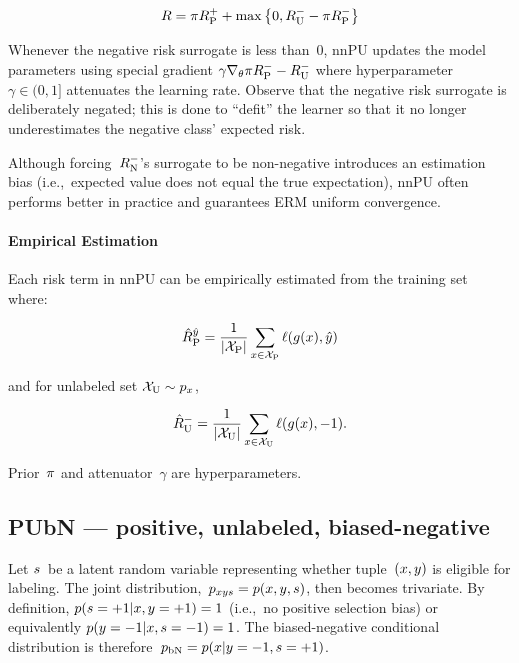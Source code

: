 \begin{equation}\label{eq:Risk:nnPU}
  R = \pi R_{\textnormal{P}}^{{+}} + \max\left\{0, R_{\textnormal{U}}^{{-}} - \pi R_{\textnormal{P}}^{{-}} \right\}
\end{equation}

Whenever the negative risk surrogate is less than~0, nnPU updates the model parameters using special gradient ${\gamma \nabla_{\theta} \pi R_{\textnormal{P}}^{{-}} - R_{\textnormal{U}}^{{-}}}$ where hyperparameter~${\gamma \in (0,1]}$ attenuates the learning rate.  Observe that the negative risk surrogate is deliberately negated; this is done to ``defit'' the learner so that it no longer underestimates the negative class' expected risk.

Although forcing~$R_{\textnormal{N}}^{{-}}$'s surrogate to be non-negative introduces an estimation bias (i.e.,~expected value does not equal the true expectation), nnPU often performs better in practice and guarantees ERM uniform convergence.

\paragraph{Empirical Estimation} Each risk term in nnPU can be empirically estimated from the training set where:

\begin{equation}\label{eq:EmpRisk:Pos}
  \hat{R}_{\textnormal{P}}^{\hat{y}} = \frac{1}{\lvert\mathcal{X}_{\textnormal{P}}\rvert} \sum_{x \in \mathcal{X}_{\textnormal{P}}} \ell\mathopen{}\left(g\mathopen{}\left(x\right)\mathclose{},\hat{y}\right)\mathclose{}
\end{equation}

\noindent
and for unlabeled set ${\mathcal{X}_{\textnormal{U}} \sim p_{x}}$,

\begin{equation}
  \hat{R}_{\textnormal{U}}^{-} = \frac{1}{\lvert\mathcal{X}_{\textnormal{U}}\rvert} \sum_{x \in \mathcal{X}_{\textnormal{U}}} \ell\mathopen{}\left(g\mathopen{}\left(x\right)\mathclose{},{-}1\right)\mathclose{} \text{.}
\end{equation}

\noindent
Prior~$\pi$ and attenuator~$\gamma$ are hyperparameters.

\subsection{PUbN --- positive, unlabeled, biased-negative}

Let $s$~be a latent random variable representing whether tuple~${(x,y)}$ is eligible for labeling.  The joint distribution,~${p_{xys} = p(x, y, s)}$, then becomes trivariate.  By definition, ${p(s = {+}1 \vert x, y = {+}1) = 1}$ (i.e.,~no positive selection bias) or equivalently ${p(y = {-}1 \vert x, s = {-}1) = 1}$.  The biased-negative conditional distribution is therefore~${p_{\textnormal{bN}} = p(x \vert y = {-}1, s = {+}1)}$.

